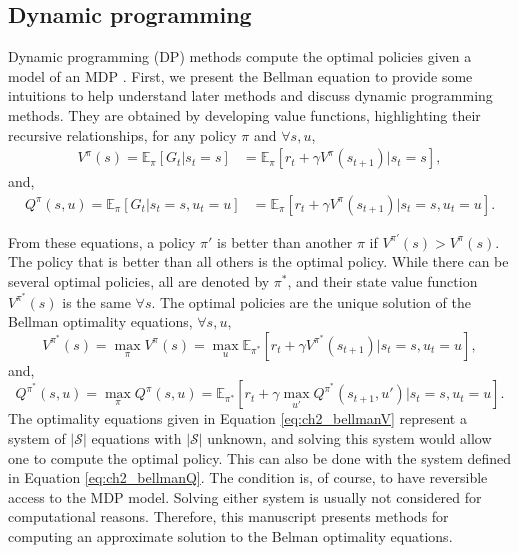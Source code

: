 \subsection{Dynamic programming}
Dynamic programming (DP) \citep{bellman1966dynamic} methods compute the optimal policies given a model of an MDP \citep{sutton2018reinforcement}.
First, we present the Bellman equation to provide some intuitions to help understand later methods and discuss dynamic programming methods.
They are obtained by developing value functions, highlighting their recursive relationships, for any policy $\pi$ and $\forall s, u$,
\begin{equation}
\label{eq:ch2_V_2}
\begin{split}
    V^\pi(s)= \mathbb{E}_{\pi}\left[G_t|s_t=s\right] & = \mathbb{E}_{\pi}\left[r_t + \gamma V^\pi(s_{t+1})|s_t=s\right],
\end{split}
\end{equation}
and,
\begin{equation}
\label{eq:ch2_Q_2}
\begin{split}
    Q^\pi(s, u) = \mathbb{E}_{\pi}\left[G_t|s_t=s, u_t=u\right] & = \mathbb{E}_{\pi}\left[r_t + \gamma V^\pi(s_{t+1})|s_t=s, u_t=u \right].
\end{split}
\end{equation}

From these equations, a policy $\pi'$ is better than another $\pi$ if $V^{\pi'}(s)>V^\pi(s)$.
The policy that is better than all others is the optimal policy.
While there can be several optimal policies, all are denoted by $\pi^*$, and their state value function $V^{\pi^*}(s)$ is the same $\forall s$.
The optimal policies are the unique solution of the Bellman optimality equations, $\forall s, u$,
\begin{equation}
\label{eq:ch2_bellmanV}
    V^{\pi^*}(s) = \max_{\pi}V^\pi(s) = \max_u \mathbb{E}_{\pi^*}[r_t + \gamma V^{\pi^*}(s_{t+1})| s_t=s, u_t=u],
\end{equation}
and,
\begin{equation}
\label{eq:ch2_bellmanQ}
    Q^{\pi^*}(s, u) =  \max_{\pi}Q^\pi(s, u) = \mathbb{E}_{\pi^*}[r_t + \gamma \max_{u'} Q^{\pi^*}(s_{t+1}, u') |s_t=s, u_t=u].
\end{equation}
The optimality equations given in Equation \ref{eq:ch2_bellmanV} represent a system of $|\mathcal{S}|$ equations with $|\mathcal{S}|$ unknown, and solving this system would allow one to compute the optimal policy.
This can also be done with the system defined in Equation \ref{eq:ch2_bellmanQ}.
The condition is, of course, to have reversible access to the MDP model.
Solving either system is usually not considered for computational reasons.
Therefore, this manuscript presents methods for computing an approximate solution to the Belman optimality equations.


